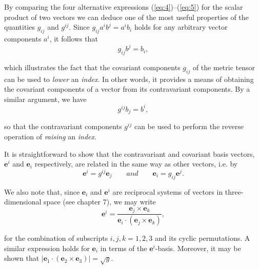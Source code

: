 \documentclass[9pt, twoside]{extbook}
\begin{document}
By comparing the four alternative expressions (\ref{eq:4})–(\ref{eq:5}) for the scalar \linebreak product of two vectors we can deduce one of the most useful properties of \linebreak the quantities $g_{ij}$ and $g^{ij}$. Since $g_{ij}a^{i}b^{j} = a^{i}b_{i}$ holds for any arbitrary vector components $a^{i}$, it follows that
\begin{equation*}
	g_{ij}b^{j} = b_{i},
\end{equation*}

\noindent which illustrates the fact that the covariant components $g_{ij}$ of the metric tensor \linebreak can be used to \textit{lower} an \textit{index}. In other words, it provides a means of obtaining \linebreak the covariant components of a vector from its contravariant components. By a similar argument, we have
\begin{equation*}
	g^{ij}b_{j} = b^{i},
\end{equation*}

\noindent so that the contravariant components $g^{ij}$ can be used to perform the reverse \linebreak operation of \textit{raising} an \textit{index}.

It is straightforward to show that the contravariant and covariant basis vectors, $\boldsymbol{e}^{i}$ and $\boldsymbol{e}_{i}$ respectively, are related in the same way as other vectors, i.e. by
\begin{equation*}
	\boldsymbol{e}^{i} = g^{ij}\boldsymbol{e}_{j}\qquad and\qquad \boldsymbol{e}_{i} = g_{ij}\boldsymbol{e}^{j}.
\end{equation*}

\noindent We also note that, since $\boldsymbol{e}_{i}$ and $\boldsymbol{e}^{i}$ are reciprocal systems of vectors in three-dimensional space (see chapter 7), we may write
\begin{equation*}
	\boldsymbol{e}^{i} = \frac{\boldsymbol{e}_{j} \times \boldsymbol{e}_{k}}{\boldsymbol{e}_{i} \cdot (\boldsymbol{e}_{j} \times \boldsymbol{e}_{k})},
\end{equation*}

\noindent for the combination of subscripts $i, j, k =1, 2, 3$ and its cyclic permutations. A \linebreak similar expression holds for $\boldsymbol{e}_{i}$ in terms of the $\boldsymbol{e}^{i}$-basis. Moreover, it may be shown that $|\boldsymbol{e}_{1} \cdot (\boldsymbol{e}_{2} \times \boldsymbol{e}_{3})| = \sqrt{g}$.
\end{document}
